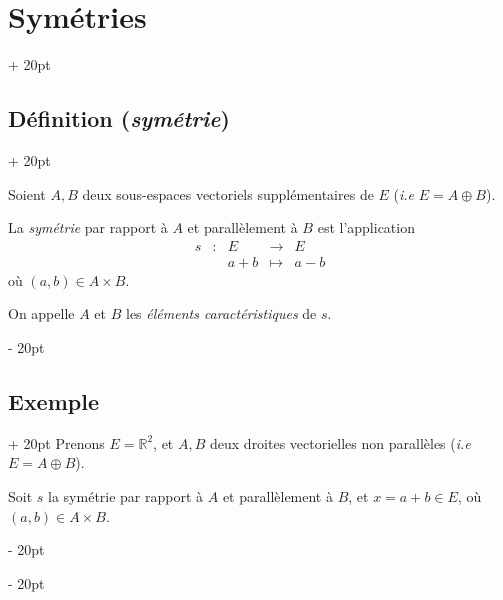 \documentclass[a4paper, 12pt, twoside]{article}
\newcommand{\R}{\mathbb{R}} %
\newcommand{\ind}[1][20pt]{\advance\leftskip + #1}
\newcommand{\deind}[1][20pt]{\advance\leftskip - #1}
\newenvironment{indt}[2][20pt]{#2 \par \ind[#1]}{\par \deind} %
\begin{document}
    \begin{indt}{\section{Symétries}}
        \begin{indt}{\subsection{Définition (\textit{symétrie})}}
            \label{2.1}

            Soient $A, B$ deux sous-espaces vectoriels supplémentaires de $E$ (\textit{i.e} $E = A \oplus B$).

            La \textit{symétrie} par rapport à $A$ et parallèlement à $B$ est l'application
            \[
                \begin{array}{ccccc}
                    s & : & E & \longrightarrow & E
                    \\
                    && a + b & \longmapsto & a - b
                \end{array}
            \]
            où $(a, b) \in A \times B$.

            On appelle $A$ et $B$ les \textit{éléments caractéristiques} de $s$.
        \end{indt}

        \vspace{12pt}
        
        \begin{indt}{\subsection{Exemple}}
            Prenons $E = \R^2$, et $A, B$ deux droites vectorielles non parallèles (\textit{i.e} $E = A \oplus B$).

            Soit $s$ la symétrie par rapport à $A$ et parallèlement à $B$, et $x = a + b \in E$, où $(a, b) \in A \times B$.

            \begin{center}
\end{center}
\end{indt}
\end{indt}
\end{document}
